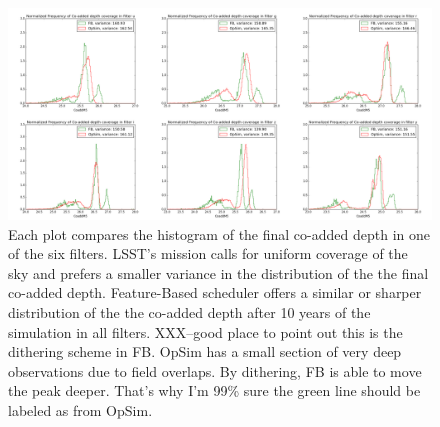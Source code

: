 \documentclass[12pt]{aastex62}
\theoremstyle{definition}
\begin{document}
\begin{figure}[h!]
\includegraphics[width=.9\linewidth]{Figures/Co_addedHist10yrs.png}
\caption{Each plot compares the histogram of the final co-added depth in one of the six filters. LSST's mission calls for uniform coverage of the sky and prefers a smaller variance in the distribution of the the final co-added depth. Feature-Based scheduler offers a similar or sharper distribution of the the co-added depth after 10 years of the simulation in all filters. XXX--good place to point out this is the dithering scheme in FB. OpSim has a small section of very deep observations due to field overlaps. By dithering, FB is able to move the peak deeper. That's why I'm 99\% sure the green line should be labeled as from OpSim.}
\label{fig_10yrs_hist}
\end{figure}
\end{document}
